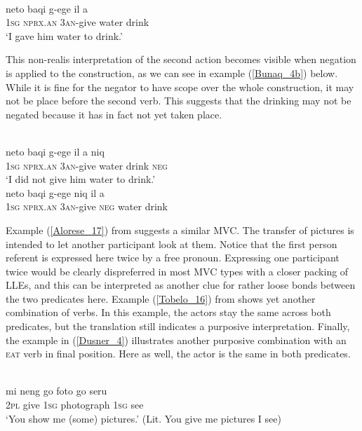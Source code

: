 \ea \label{Bunaq_4}
\\
\gll neto baqi g-ege il a \\
1\textsc{sg} \textsc{nprx}.\textsc{an} 3\textsc{an}-give water drink \\
\glft ‘I gave him water to drink.’\\ 
\z

This non-realis interpretation of the second action becomes visible when negation is applied to the construction, as we can see in example (\ref{Bunaq_4b}) below. While it is fine for the negator to have scope over the whole construction, it may not be place before the second verb. This suggests that the drinking may not be negated because it has in fact not yet taken place. 

\ea \label{Bunaq_4b}
\\
\ea
\gll neto baqi g-ege il a niq \\
1\textsc{sg} \textsc{nprx}.\textsc{an} 3\textsc{an}-give water drink \textsc{neg} \\
\glft ‘I did not give him water to drink.’ \\ 
\ex
\gll *neto baqi g-ege niq il a \\ 
1\textsc{sg} \textsc{nprx}.\textsc{an} 3\textsc{an}-give \textsc{neg} water drink \\
\z
\z

Example (\ref{Alorese_17}) from  suggests a similar MVC. The transfer of pictures is intended to let another participant look at them. Notice that the first person referent is expressed here twice by a free pronoun. Expressing one participant twice would be clearly dispreferred in most MVC types with a closer packing of LLEs, and this can be interpreted as another clue for rather loose bonds between the two predicates here. Example (\ref{Tobelo_16}) from  shows yet another combination of verbs. In this example, the actors stay the same across both predicates, but the translation still indicates a purposive interpretation. Finally, the  example in (\ref{Dusner_4}) illustrates another purposive combination with an \textsc{eat} verb in final position. Here as well, the actor is the same in both predicates.

\ea \label{Alorese_17}
\\
\gll mi neng go foto go seru \\
2\textsc{pl} give 1\textsc{sg} photograph 1\textsc{sg} see \\
\glft `You show me (some) pictures.' (Lit. You give me pictures I see) \\ 
\z

